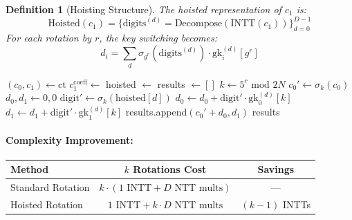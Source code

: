 \documentclass[11pt,a4paper]{article}
\newtheorem{definition}{Definition}
\newcommand{\bmod}{\text{ mod }}
\begin{document}
\begin{definition}[Hoisting Structure]
The hoisted representation of $c_1$ is:
\[
\text{Hoisted}(c_1) = \{ \text{digits}^{(d)} = \text{Decompose}(\text{INTT}(c_1)) \}_{d=0}^{D-1}
\]
For each rotation by $r$, the key switching becomes:
\[
d_i = \sum_{d} \sigma_{g^r}(\text{digits}^{(d)}) \cdot \text{gk}_i^{(d)}[g^r]
\]
\end{definition}

\begin{algorithm}[H]
\caption{Hoisted Multi-Rotation}
\begin{algorithmic}[1]
    \State {}
    \State $(c_0, c_1) \gets \text{ct}$
    \State
    \State {}
    \State $c_1^{\text{coeff}} \gets$ 
    \State hoisted $\gets$ 
    \State
    \State {}
    \State results $\gets []$
        \State $k \gets 5^r \bmod 2N$
        \State $c_0' \gets \sigma_k(c_0)$
        \State
        \State {}
        \State $d_0, d_1 \gets 0, 0$
            \State $\text{digit}' \gets \sigma_k(\text{hoisted}[d])$
            \State $d_0 \gets d_0 + \text{digit}' \cdot \text{gk}_0^{(d)}[k]$
            \State $d_1 \gets d_1 + \text{digit}' \cdot \text{gk}_1^{(d)}[k]$
        \EndFor
        \State
        \State results.append$(c_0' + d_0, d_1)$
    \EndFor
    \State \Return results
\EndFunction
\end{algorithmic}
\end{algorithm}

\paragraph{Complexity Improvement:}
\begin{center}
\begin{tabular}{lcc}
\toprule
\textbf{Method} & \textbf{$k$ Rotations Cost} & \textbf{Savings} \\
\midrule
Standard Rotation & $k \cdot (1 \text{ INTT} + D \text{ NTT mults})$ & — \\
Hoisted Rotation & $1 \text{ INTT} + k \cdot D \text{ NTT mults}$ & $(k-1)$ INTTs \\
\bottomrule
\end{tabular}
\end{center}
\end{document}

